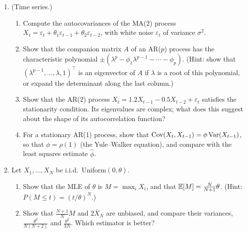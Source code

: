 \begin{enumerate}[leftmargin=*]
\begin{enumerate}[label=(\alph*)]
        \item (Policy iteration.) Starting from a policy $\pi_0$, compute $\mathbf{V}^{\pi_k}$ by solving the Bellman equation, and let $\pi_{k+1}$ be greedy with respect to $\mathbf{V}^{\pi_k}$, i.e., let it maximize $r(s, a) + \gamma\sum_{s'}P(s' \mid s, a)V^{\pi_k}_{s'}$ over $a$ in every state $s$. Show that $\mathbf{V}^{\pi_{k+1}} \geq \mathbf{V}^{\pi_k}$, and that if $\mathbf{V}^{\pi_{k+1}} = \mathbf{V}^{\pi_k}$, then $\pi_k$ is optimal. Conclude that policy iteration finds an optimal policy after finitely many steps.
    \end{enumerate}
    \item\label{L4-ex4:time-series} (Time series.)
    \begin{enumerate}[label=(\alph*)]
        \item Compute the autocovariances of the MA(2) process $X_t = \varepsilon_t + \theta_1\varepsilon_{t-1} + \theta_2\varepsilon_{t-2}$, with white noise $\varepsilon_t$ of variance $\sigma^2$.
        \item Show that the companion matrix $A$ of an AR($p$) process has the characteristic polynomial $\pm(\lambda^p - \phi_1\lambda^{p-1} - \cdots - \phi_p)$. (Hint: show that $(\lambda^{p-1}, \ldots, \lambda, 1)^\top$ is an eigenvector of $A$ if $\lambda$ is a root of this polynomial, or expand the determinant along the last column.)
        \item Show that the AR(2) process $X_t = 1.2X_{t-1} - 0.5X_{t-2} + \varepsilon_t$ satisfies the stationarity condition. Its eigenvalues are complex; what does this suggest about the shape of its autocorrelation function?
        \item For a stationary AR(1) process, show that $\operatorname{Cov}(X_t, X_{t-1}) = \phi\operatorname{Var}(X_{t-1})$, so that $\phi = \rho(1)$ (the Yule--Walker equation), and compare with the least squares estimate $\hat\phi$.
    \end{enumerate}
    \item\label{L4-ex4:uniform-mle} Let $X_1, \ldots, X_N$ be i.i.d.\ Uniform$(0, \theta)$.
    \begin{enumerate}[label=(\alph*)]
        \item Show that the MLE of $\theta$ is $M = \max_i X_i$, and that $\mathbb{E}[M] = \frac{N}{N + 1}\theta$. (Hint: $P(M \leq t) = (t/\theta)^N$.)
        \item Show that $\frac{N + 1}{N}M$ and $2\bar X_N$ are unbiased, and compare their variances, $\frac{\theta^2}{N(N + 2)}$ and $\frac{\theta^2}{3N}$. Which estimator is better?

\end{enumerate}
\end{enumerate}
